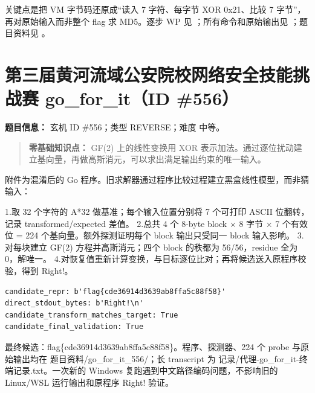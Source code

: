 关键点是把 VM 字节码还原成``读入 7 字符、每字节 XOR 0x21、比较 7 字节''，再对原始输入而非整个 flag 求 MD5。逐步 WP 见 \texttt{}；所有命令和原始输出见 \texttt{}；题目资料见 \texttt{}。

\section{第三届黄河流域公安院校网络安全技能挑战赛 go\_for\_it（ID \#556）}\label{ux7b2cux4e09ux5c4aux9ec4ux6cb3ux6d41ux57dfux516cux5b89ux9662ux6821ux7f51ux7edcux5b89ux5168ux6280ux80fdux6311ux6218ux8d5b-go_for_itid-556}

\textbf{题目信息：} 玄机 ID \#556；类型 REVERSE；难度 中等。

\begin{quote}
\textbf{零基础知识点：} GF(2) 上的线性变换用 XOR 表示加法。通过逐位扰动建立基向量，再做高斯消元，可以求出满足输出约束的唯一输入。
\end{quote}

附件为混淆后的 Go 程序。旧求解器通过程序比较过程建立黑盒线性模型，而非猜输入：

1.取 32 个字符的 A*32 做基准；每个输入位置分别将 7 个可打印 ASCII 位翻转，记录 transformed/expected 差值。 2.总共 4 个 8-byte block × 8 字节 × 7 个有效位 = 224 个基向量。额外探测证明每个 block 输出只受同一 block 输入影响。 3.对每块建立 GF(2) 方程并高斯消元；四个 block 的秩都为 56/56，residue 全为 0，解唯一。 4.对恢复值重新计算变换，与目标逐位比对；再将候选送入原程序校验，得到 Right!。

\begin{verbatim}
candidate_repr: b'flag{cde36914d3639ab8ffa5c88f58}'
direct_stdout_bytes: b'Right!\n'
candidate_transform_matches_target: True
candidate_final_validation: True
\end{verbatim}

最终候选：flag\{cde36914d3639ab8ffa5c88f58\}。程序、探测器、224 个 probe 与原始输出均在 题目资料/go\_for\_it\_556/；长 transcript 为 记录/代理-go\_for\_it-终端记录.txt。一次新的 Windows 复跑遇到中文路径编码问题，不影响旧的 Linux/WSL 运行输出和原程序 Right! 验证。

